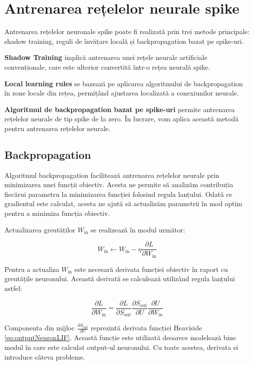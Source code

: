 \section{Antrenarea rețelelor neurale spike}

Antrenarea rețelelor neuronale spike poate fi realizată prin trei metode principale: shadow training, reguli de învățare locală și backpropagation bazat pe spike-uri.

\textbf{Shadow Training} implică antrenarea unei rețele neurale artificiale convenționale, care este ulterior convertită într-o rețea neurală spike.

\textbf{Local learning rules} se bazează pe aplicarea algoritmului de backpropagation în zone locale din rețea, permițând ajustarea localizată a conexiunilor neurale.

\textbf{Algoritmul de backpropagation bazat pe spike-uri} permite antrenarea rețelelor neurale de tip spike de la zero. În lucrare, vom aplica această metodă pentru antrenarea rețelelor neurale.

\subsection{Backpropagation}

Algoritmul backpropagation facilitează antrenarea rețelelor neurale prin minimizarea unei funcții obiectiv. Acesta ne permite să analizăm contribuția fiecărui parametru la minimizarea funcției folosind regula lanțului. Odată ce gradientul este calculat, acesta ne ajută să actualizăm parametrii în mod optim pentru a minimiza funcția obiectiv.

Actualizarea greutăților $W_\text{in}$ se realizează în modul următor:

\begin{equation}
W_\text{in} \leftarrow W_\text{in} - \eta \frac{\partial L}{\partial W_\text{in}}
\end{equation}

Pentru a actualiza $W_\text{in}$ este necesară derivata funcției obiectiv în raport cu greutățile neuronului. Această derivată se calculează utilizând regula lanțului astfel:


\begin{equation}
\frac{\partial L}{\partial W_\text{in}} = \frac{\partial L}{\partial S_\text{out}} \frac{\partial S_\text{out}}{\partial U} \frac{\partial U}{\partial W_\text{in}}
\end{equation}

Componenta din mijloc $\frac{\partial S_\text{out}}{\partial U}$ reprezintă derivata funcției Heaviside \eqref{eq:outputNeuronLIF}. Această funcție este utilizată deoarece modelează bine modul în care este calculat output-ul neuronului. Cu toate acestea, derivata ei introduce câteva probleme.


